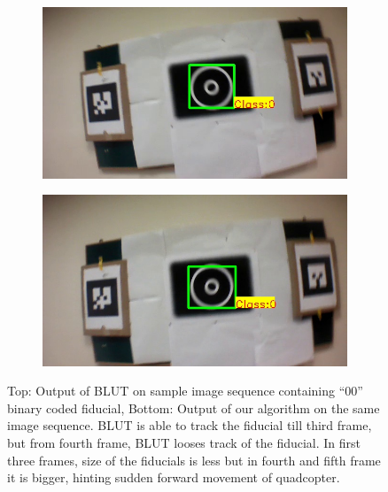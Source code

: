\documentclass[runningheads]{llncs}
\begin{document}
\begin{figure}
\begin{subfigure}[b]{.19\textwidth}
\end{subfigure}
\begin{subfigure}[b]{.19\textwidth}
\includegraphics[width=\linewidth]{BLUT_input_00/output5.jpg}
\end{subfigure}
\begin{subfigure}[b]{.19\textwidth}
\includegraphics[width=\linewidth]{BLUT_input_00/output6.jpg}
\end{subfigure}
\caption{Top: Output of BLUT\cite{Wu:2011} on sample image sequence containing ``00''
binary coded fiducial, Bottom: Output of our algorithm on the same image
sequence. BLUT is able to track the fiducial till third frame, but from fourth
frame, BLUT looses track of the fiducial. In first three frames, size of the
fiducials is less but in fourth and fifth frame it is bigger, hinting sudden
forward movement of quadcopter.}
\label{fig:BLUT_compare_00}
\end{figure}
\end{document}
